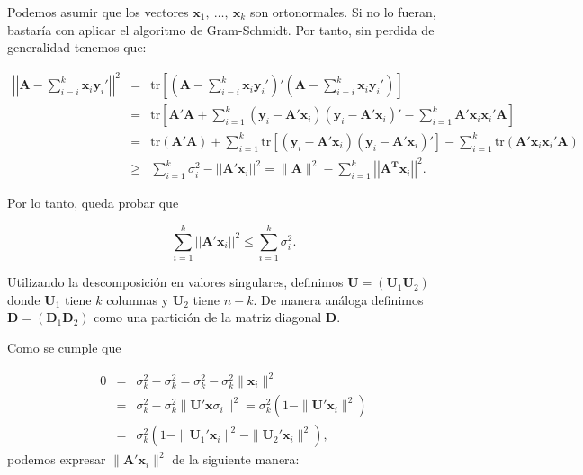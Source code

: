 \documentclass[tfg,cienciasbased,lot,lof,covers,final,overleaf,nocopyright]{tfgtfmthesisuam}
\newcommand{\normleft}{\left|\left|}
\newcommand{\normright}{\right|\right|}
\begin{document}
Podemos asumir que los vectores $\mathbf{x}_1,\ \ldots,\ \mathbf{x}_k$ son ortonormales. Si no lo fueran, bastaría con aplicar el algoritmo de Gram-Schmidt. Por tanto, sin perdida de generalidad tenemos que:

\begin{eqnarray*}
    \normleft \mathbf{A} - \sum_{i=i}^{k} \mathbf{x}_i \mathbf{y}_i' \normright^2 & = & \mbox{tr}\left [(\mathbf{A} - \sum_{i=i}^{k} \mathbf{x}_i \mathbf{y}_i')'(\mathbf{A} - \sum_{i=i}^{k} \mathbf{x}_i \mathbf{y}_i')\right]\\
    & = & \mbox{tr}\left [\mathbf{A'A} + \sum_{i=1}^{k}(\mathbf{y}_i-\mathbf{A'}\mathbf{x}_i)(\mathbf{y}_i-\mathbf{A'}\mathbf{x}_i)' - \sum_{i=1}^{k} \mathbf{A'}\mathbf{x}_i\mathbf{x}_i'\mathbf{A}\right ] \\
    & = & \mbox{tr}(\mathbf{A'A})+\sum_{i=1}^{k}\mbox{tr}[(\mathbf{y}_i-\mathbf{A'}\mathbf{x}_i)(\mathbf{y}_i-\mathbf{A'}\mathbf{x}_i)'] - \sum_{i=1}^{k}\mbox{tr}(\mathbf{A'}\mathbf{x}_i\mathbf{x}_i'\mathbf{A}) \\
    & \geq & \sum_{i=1}^{k}\sigma_i^2 -\normleft \mathbf{A'}\mathbf{x}_i\normright^2
    =  \| \mathbf{A} \|^2 - \sum_{i=1}^{k} \normleft \mathbf{A^T}\mathbf{x}_i\normright^2.
\end{eqnarray*}

Por lo tanto, queda probar que 

\begin{equation*}
    \sum_{i=1}^{k} \normleft \mathbf{A'}\mathbf{x}_i\normright^2 \leq \sum_{i=1}^{k} \sigma_i^2.
\end{equation*}

Utilizando la descomposición en valores singulares, definimos $\mathbf{U} = (\mathbf{U}_1 \mathbf{U}_2)$ donde $\mathbf{U}_1$ tiene $k$ columnas y $\mathbf{U}_2$ tiene $n - k$. De manera análoga definimos $\mathbf{D} = (\mathbf{D}_1 \mathbf{D}_2)$ como una partición de la matriz diagonal $\mathbf{D}$.

Como se cumple que

\begin{eqnarray*}
    0 & = & \sigma_k^2 - \sigma_k^2 =  \sigma_k^2 - \sigma_k^2 \| \mathbf{x}_i \|^2 \\
    & = & \sigma_k^2 - \sigma_k^2 \| \mathbf{U'x} \sigma_i \|^2 = \sigma_k^2 ( 1 -  \| \mathbf{U'x}_i \|^2) \\
    & = & \sigma_k^2 ( 1 -  \| \mathbf{U}_1'\mathbf{x}_i \|^2 -  \| \mathbf{U}_2'\mathbf{x}_i \|^2),
\end{eqnarray*}
podemos expresar $\| \mathbf{A'x}_i \|^2$ de la siguiente manera:
\end{document}
